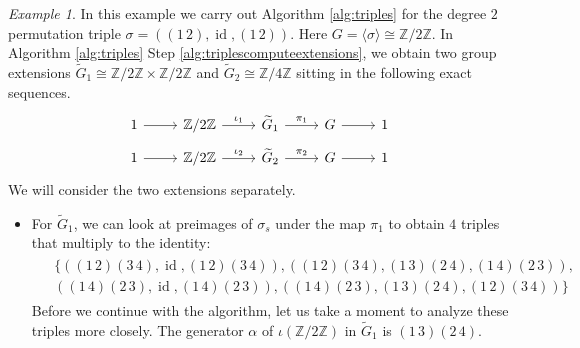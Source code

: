 \documentclass{dcthesis}
\newcommand{\ZZ}{\mathbb Z}
\newcommand{\wt}[1]{\widetilde{#1}}
\DeclareMathOperator{\Lifts}{Lifts}
\DeclareMathOperator{\id}{id}
\numberwithin{equation}{section}
\theoremstyle{definition}
\theoremstyle{remark}
\newtheorem{example}[equation]{Example}
\begin{document}
{{{    \begin{example}\label{exm:lift}
      In this example we carry out Algorithm
      \ref{alg:triples} for
      the degree $2$ permutation triple
      $\sigma = ((1\,2),\id,(1\,2))$.
      Here $G = \langle\sigma\rangle\cong\ZZ/2\ZZ$.
      In
      Algorithm \ref{alg:triples}
      Step \ref{alg:triplescomputeextensions},
      we obtain two group extensions
      $\wt{G}_1\cong\ZZ/2\ZZ\times\ZZ/2\ZZ$
      and
      $\wt{G}_2\cong\ZZ/4\ZZ$
      sitting in the following
      exact sequences.
      \begin{align}
        \label{eqn:liftexampleextensions}
        \begin{split}
          \begin{tikzcd}[ampersand replacement=\&, row sep = small]
            1\arrow{r}\&\ZZ/2\ZZ\arrow{r}{\iota_1}\&\wt{G}_1\arrow{r}{\pi_1}\&G\arrow{r}\&1
          \end{tikzcd}
          \\
          \begin{tikzcd}[ampersand replacement=\&, row sep = small]
            1\arrow{r}\&\ZZ/2\ZZ\arrow{r}{\iota_2}\&\wt{G}_2\arrow{r}{\pi_2}\&G\arrow{r}\&1
          \end{tikzcd}
        \end{split}
      \end{align}
      We will consider the
      two extensions separately.
      \begin{itemize}
        \item
          For $\wt{G}_1$,
          we can look at preimages of
          $\sigma_s$ under the map $\pi_1$
          to obtain $4$ triples that
          multiply to the identity:
          \begin{align}
            \label{eqn:examplelifts1}
            \begin{split}
            &\Big\{
              ((1\,2)(3\,4), \id, (1\,2)(3\,4)),
              ((1\,2)(3\,4), (1\,3)(2\,4), (1\,4)(2\,3)),\\
            &((1\,4)(2\,3), \id, (1\,4)(2\,3)),
              ((1\,4)(2\,3), (1\,3)(2\,4), (1\,2)(3\,4))
            \Big\}
            \end{split}
          \end{align}
          Before we continue with the algorithm,
          let us take a moment to
          analyze these triples
          more closely.
          The generator $\alpha$
          of $\iota(\ZZ/2\ZZ)$
          in $\wt{G}_1$ is $(1\,3)(2\,4)$.

\end{itemize}
\end{example}}}}
\end{document}
